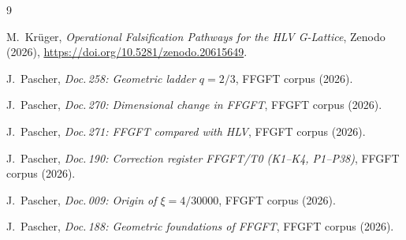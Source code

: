 \begin{thebibliography}{9}

M.~Krüger,
\emph{Operational Falsification Pathways for the HLV G-Lattice},
Zenodo (2026),
\url{https://doi.org/10.5281/zenodo.20615649}.

J.~Pascher, \emph{Doc.\,258: Geometric ladder $q=2/3$},
FFGFT corpus (2026).

J.~Pascher, \emph{Doc.\,270: Dimensional change in FFGFT},
FFGFT corpus (2026).

J.~Pascher, \emph{Doc.\,271: FFGFT compared with HLV},
FFGFT corpus (2026).

J.~Pascher, \emph{Doc.\,190: Correction register FFGFT/T0
(K1--K4, P1--P38)}, FFGFT corpus (2026).

J.~Pascher, \emph{Doc.\,009: Origin of $\xi = 4/30000$},
FFGFT corpus (2026).

J.~Pascher, \emph{Doc.\,188: Geometric foundations of FFGFT},
FFGFT corpus (2026).

\end{thebibliography}
